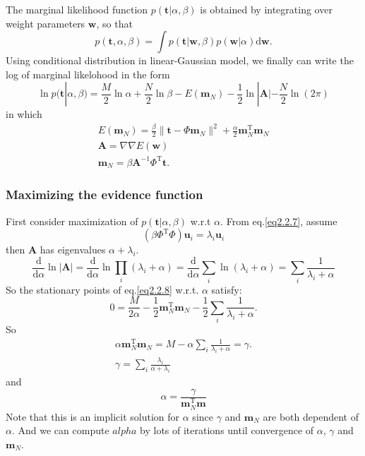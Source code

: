 \documentclass[a4paper]{book}
\newcommand{\mrm}{\mathrm}
\newcommand{\mbf}{\mathbf}
\newcommand{\ud}{\mathrm{d}}
\newcommand{\ww}{\mbf w}
\newcommand{\mm}{\mbf m}
\newcommand{\ttt}{\mbf t}
\newcommand{\uu}{\mbf u}
\newcommand{\rev}{^{-1}}
\newcommand{\trans}{^{\mrm T}}
\begin{document}
The marginal likelihood function $p(\ttt|\alpha,\beta)$ is obtained by integrating over weight parameters $\ww$, so that
\begin{equation}\label{}
  p(\ttt,\alpha,\beta) = \int p(\ttt|\ww,\beta)p(\ww|\alpha)\mrm d\ww.
\end{equation}
Using conditional distribution in linear-Gaussian model, we finally can write the log of marginal likelohood in the form
\begin{equation}\label{eq2.2.8}
  \ln p(\ttt|\alpha, \beta) = \frac M2\ln \alpha +\frac N2\ln\beta-E(\mbf m_N)-\frac12\ln|\mbf A|-\frac N2\ln(2\pi)
\end{equation}
in which
\begin{gather}\label{eq2.2.7}
  E(\mbf m_N) = \frac{\beta}{2}\|\ttt-\Phi\mbf m_N\|^2+\frac\alpha2\mbf m_N^\mrm T\mbf m_N \\
  \mbf A=\nabla\nabla E(\ww) \\
  \mbf m_N=\beta \mbf A\rev \Phi \trans\ttt.
\end{gather}
\subsubsection*{Maximizing the evidence function}
First consider maximization of $p(\ttt|\alpha, \beta)$ w.r.t $\alpha$. From eq.\ref{eq2.2.7}, assume
\begin{equation}\label{}
  (\beta\Phi\trans\Phi)\uu_i=\lambda_i\uu_i
\end{equation}
then $\mbf A$ has eigenvalues $\alpha +\lambda_i$.
\begin{equation}\label{}
  \frac{\ud}{\ud \alpha}\ln|\mbf A|=\frac{\ud}{\ud\alpha}\ln\prod_{i}(\lambda_i+\alpha)=\frac{\ud}{\ud\alpha}\sum_i\ln(\lambda_i+\alpha)=\sum_i\frac1{\lambda_i+\alpha}
\end{equation}
So the stationary points of eq.\ref{eq2.2.8} w.r.t. $\alpha$ satisfy:
\begin{equation}\label{}
  0=\frac{M}{2\alpha}-\frac12\mm_N\trans\mm_N-\frac12\sum_i\frac1{\lambda_i+\alpha}.
\end{equation}
So
\begin{gather}\label{}
  \alpha\mm_N\trans\mm_N=M-\alpha\sum_i\frac1{\lambda_i+\alpha}=\gamma.\\
  \gamma = \sum_{i}\frac{\lambda_i}{\alpha+\lambda_i}
\end{gather}
and
\begin{equation}\label{}
  \alpha = \frac{\gamma}{\mm_N\trans\mm}
\end{equation}
Note that this is an implicit solution for $\alpha$ since $\gamma$ and $\mm_N$ are both dependent of $\alpha$.  And we can compute $
alpha$ by lots of iterations until convergence of $\alpha$, $\gamma$ and $\mm_N$.
\end{document}

